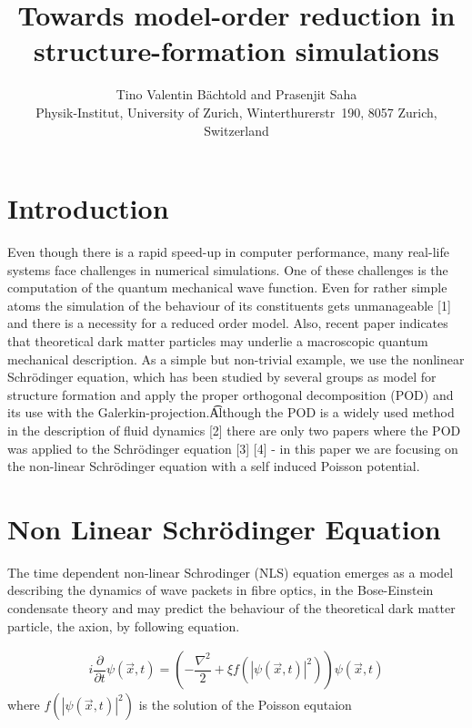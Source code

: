 \documentclass[usenatbib]{mn2e}
\title{Towards model-order reduction in structure-formation simulations}
\author[B\"achtold and Saha]
{Tino Valentin B\"achtold and Prasenjit Saha \\
Physik-Institut, University of Zurich, Winterthurerstr~190, 8057
Zurich, Switzerland \\ }
\date{}
\begin{document}
\maketitle

\begin{abstract}
\end{abstract}

\begin{keywords}

\end{keywords}

\section{Introduction}
Even though there is a rapid speed-up in computer performance, many real-life systems face challenges in numerical simulations. One of these challenges is the computation of the quantum mechanical wave function. Even for rather simple atoms the simulation of the behaviour of its constituents gets unmanageable [1] and there is a necessity for a reduced order model. Also, recent paper indicates that theoretical dark matter particles may underlie a macroscopic quantum mechanical description. 
As a simple but non-trivial example, we use the nonlinear
Schr\"odinger equation, which has been studied by several groups as
model for structure formation\cite{1993ApJ...416L..71W} and apply the proper orthogonal decomposition (POD) and its use with the Galerkin-projection.\t
Although the POD is a widely used method in the description of fluid dynamics [2] there are only two papers where the POD was applied to the Schr\"odinger equation [3] [4] - in this paper we are focusing on the non-linear Schr\"odinger equation with a self induced Poisson potential. \citep{www.goog.e}


\section{Non Linear Schr\"odinger Equation}
The time dependent non-linear Schrodinger (NLS) equation emerges as a model describing the dynamics of wave packets in fibre optics, in the Bose-Einstein condensate theory and may predict the behaviour of the theoretical dark matter particle, the axion, by following equation.


\begin{equation} \label{eq1}
\begin{split}
i\dfrac {\partial } {\partial t}\psi\left( \overrightarrow{x},t\right) =\left( -\dfrac {\nabla ^{2}} {2}+ \xi f\left( \left| \psi\left( \overrightarrow {x},t\right) \right| ^{2}\right) \right) \psi\left( \overrightarrow {x},t\right)
\end{split}
\end{equation}
where \(f\left( \left| \psi \left( \overrightarrow {x},t\right) \right| ^{2}\right)\) is the solution of the Poisson equtaion
\end{document}
